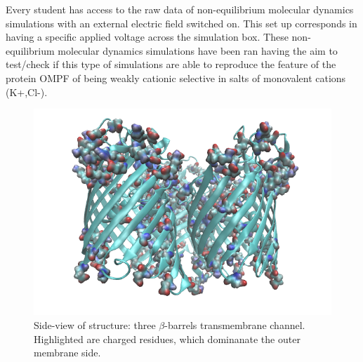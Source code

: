 \documentclass{article}[12pt]
\numberwithin{equation}{section}
\begin{document}
Every student has access to the raw data of non-equilibrium molecular
dynamics simulations with an external electric field switched on. This set up
corresponds in having a specific applied voltage across the simulation box.
These non-equilibrium molecular dynamics simulations have been ran having
the aim to test/check if this type of simulations are able to reproduce the
feature of the protein OMPF of being weakly cationic selective in salts of
monovalent cations (K+,Cl-).
\begin{figure}[H]
	\centering{}
	\captionsetup{justification=centering}
	\includegraphics[scale=0.5]{ompf}
\caption{Side-view of structure: three $\beta$-barrels transmembrane channel.\\
Highlighted are charged residues, which dominanate the outer membrane side.}
\label{fig:ompF}
\end{figure}
\end{document}
